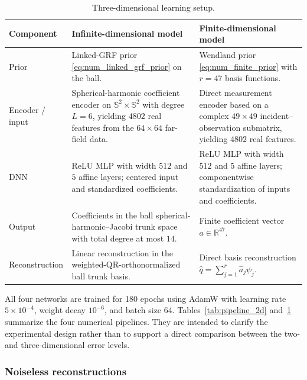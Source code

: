 \documentclass{article}
\numberwithin{equation}{section}
\theoremstyle{plain}
\newcommand{\RR}{\mathbb{R}}
\newcommand{\SSS}{\mathbb{S}}
\begin{document}
\begin{table}[H]
\centering
\caption{Three-dimensional learning setup.}
\label{tab:pipeline_3d}
\begin{tabular}{@{}p{}p{}p{}@{}}
\toprule
Component & Infinite-dimensional model & Finite-dimensional model \\
\midrule
Prior
& Linked-GRF prior \eqref{eq:num_linked_grf_prior} on the ball.
& Wendland prior \eqref{eq:num_finite_prior} with $r=47$ basis functions. \\
\addlinespace
Encoder / input
& Spherical-harmonic coefficient encoder on $\SSS^2\times\SSS^2$ with degree $L=6$, yielding $4802$ real features from the $64\times64$ far-field data.
& Direct measurement encoder based on a complex $49\times49$ incident--observation submatrix, yielding $4802$ real features. \\
\addlinespace
DNN
& ReLU MLP with width $512$ and $5$ affine layers; centered input and standardized coefficients.
& ReLU MLP with width $512$ and $5$ affine layers; componentwise standardization of inputs and coefficients. \\
\addlinespace
Output
& Coefficients in the ball spherical-harmonic--Jacobi trunk space with total degree at most $14$.
& Finite coefficient vector $a\in\RR^{47}$. \\
\addlinespace
Reconstruction
& Linear reconstruction in the weighted-QR-orthonormalized ball trunk basis.
& Direct basis reconstruction $\widehat q=\sum_{j=1}^r\widehat a_j\psi_j$. \\
\bottomrule
\end{tabular}
\end{table}

All four networks are trained for 180 epochs using AdamW with learning rate $5\times10^{-4}$, weight decay $10^{-6}$, and batch size $64$. Tables~\ref{tab:pipeline_2d} and~\ref{tab:pipeline_3d} summarize the four numerical pipelines.  They are intended to clarify the experimental design rather than to support a direct comparison between the two- and three-dimensional error levels.

\subsubsection{Noiseless reconstructions}
\end{document}

